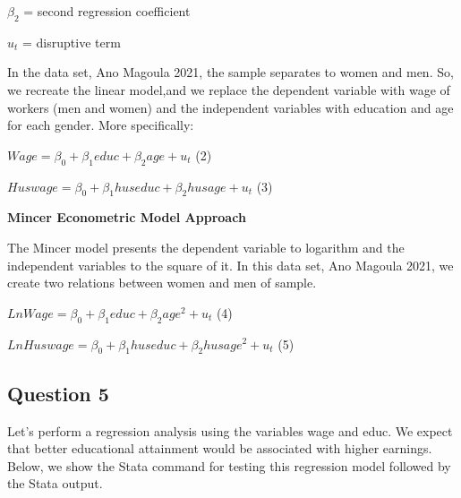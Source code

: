 \documentclass{article}
\begin{document}
$\beta_2$ = second regression coefficient
	\vspace {0.5\baselineskip}

$u_t$ = disruptive term
	\vspace {0.5\baselineskip}
	
	In the data set, Ano Magoula 2021, the sample separates to women and men. So, we recreate the linear model,and we replace the dependent variable with wage of workers (men and women) and the independent variables with education and age for each gender. More specifically:
	\vspace {0.5\baselineskip}

\begin{Center}
\large	$Wage = \beta_0 + \beta_1 educ + \beta_2 age + u_t$  (2)
	\vspace {0.5\baselineskip}

\large	$Huswage = \beta_0 + \beta_1 huseduc + \beta_2 husage + u_t$  (3)
	\vspace {0.5\baselineskip}
\end{Center}

\large\textbf{Mincer Econometric Model Approach}
	\vspace {0.5\baselineskip}

	The Mincer model presents the dependent variable to logarithm and the independent variables to the square of it. In this data set, Ano Magoula 2021, we create two relations between women and men of sample.
	\vspace {0.5\baselineskip}
	
\begin{Center}
\large $LnWage = \beta_0 + \beta_1 educ + \beta_2 age^{2} + u_t$ 	(4)
	\vspace {0.5\baselineskip}

\large $LnHuswage = \beta_0 + \beta_1 huseduc + \beta_2 husage^{2} + u_t$ 	(5)
	\vspace {0.5\baselineskip}
\end{Center}

	\subsection{Question 5}
	\vspace {0.5\baselineskip}	
	
	Let’s perform a regression analysis using the variables wage and educ. 
	We expect that better educational attainment would be associated with higher earnings. Below, we show the Stata command for testing this regression model followed by the Stata output. 
	\vspace {0.5\baselineskip}
	
\end{document}
